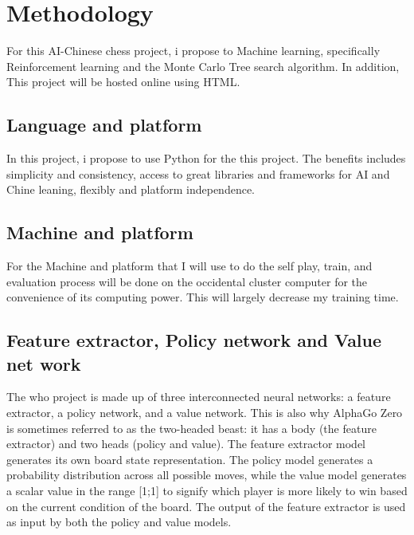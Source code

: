 \documentclass[10pt,twocolumn]{article}
\begin{document}
\section{Methodology}
    For this AI-Chinese chess project, i propose to Machine learning, specifically Reinforcement learning and the Monte Carlo Tree search algorithm. In addition, This project will be hosted online using HTML.
    
\subsection{Language and platform}
    In this project, i propose to use Python for the this project. The benefits includes simplicity and consistency, access to great libraries and frameworks for AI and Chine leaning, flexibly and platform independence.
    
\subsection{Machine and platform}
    For the Machine and platform that I will use to do the self play, train, and evaluation process will be done on the occidental cluster computer for the convenience of its computing power. This will largely decrease my training time. 

\subsection{Feature extractor, Policy network and Value net work}
    The who project is made up of three interconnected neural networks: a feature extractor, a policy network, and a value network. This is also why AlphaGo Zero is sometimes referred to as the two-headed beast: it has a body (the feature extractor) and two heads (policy and value). The feature extractor model generates its own board state representation. The policy model generates a probability distribution across all possible moves, while the value model generates a scalar value in the range [1;1] to signify which player is more likely to win based on the current condition of the board. The output of the feature extractor is used as input by both the policy and value models.\cite{Java}
\end{document}
